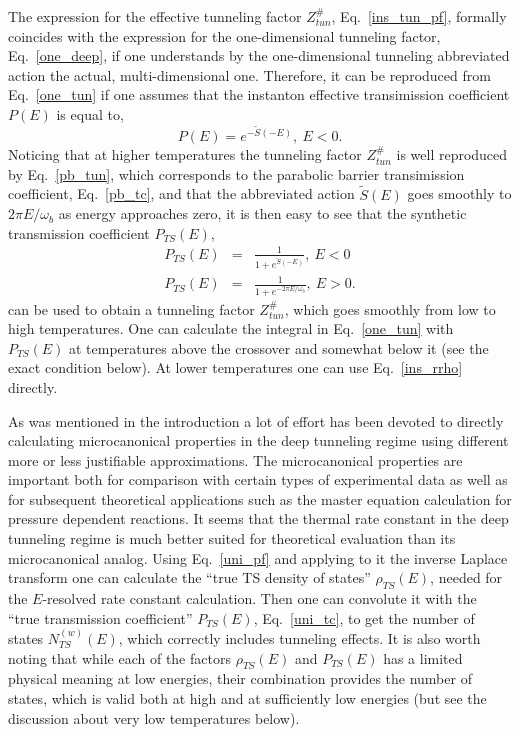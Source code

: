 \documentclass[journal=jpcafh,manuscript=article]{achemso}
\begin{document}
The expression for the effective tunneling factor $Z^\#_{tun}$,
Eq.~\ref{ins_tun_pf}, formally coincides with the expression for the
one-dimensional tunneling factor, Eq.~\ref{one_deep}, if one
understands by the one-dimensional tunneling abbreviated action the
actual, multi-dimensional one. Therefore, it can be reproduced from
Eq.~\ref{one_tun} if one assumes that the instanton effective
transimission coefficient $P(E)$ is equal to,
\begin{equation}
  \label{ins_tc}
  P(E)=e^{-\tilde{S}(-E)},\ E<0.
\end{equation}
Noticing that at higher temperatures the tunneling factor $Z^\#_{tun}$
is well reproduced by Eq.~\ref{pb_tun}, which corresponds to the
parabolic barrier transimission coefficient, Eq.~\ref{pb_tc}, and that
the abbreviated action $\tilde{S}(E)$ goes smoothly to
$2\pi E/\omega_b$ as energy approaches zero, it is then easy to see
that the synthetic transmission coefficient
$P_{TS}(E)$,
\begin{eqnarray}
  \label{uni_tc}
  P_{TS}(E) &=& \frac{1}{1 + e^{\tilde{S}(-E)}},\ E<0
  \\
  \nonumber
  P_{TS}(E) &=& \frac{1}{1 + e^{-2\pi E/\omega_b}},\ E>0.
\end{eqnarray}
can be used to obtain a tunneling factor $Z^\#_{tun}$, which goes
smoothly from low to high
temperatures. \cite{affleck81,richardson16a,kemble35} One can
calculate the integral in Eq.~\ref{one_tun} with $P_{TS}(E)$ at
temperatures above the crossover and somewhat below it (see the exact
condition below). At lower temperatures one can use Eq.~\ref{ins_rrho}
directly.

As was mentioned in the introduction a lot of effort has been devoted
to directly calculating microcanonical properties in the deep
tunneling regime using different more or less justifiable
approximations. The microcanonical properties are important both for
comparison with certain types of experimental data as well as for
subsequent theoretical applications such as the master equation
calculation for pressure dependent reactions.  It seems that the
thermal rate constant in the deep tunneling regime is much better
suited for theoretical evaluation than its microcanonical
analog. Using Eq.~\ref{uni_pf} and applying to it the inverse Laplace
transform\cite{fang21} one can calculate the ``true TS density of
states'' $\rho_{TS}(E)$, needed for the $E$-resolved rate constant
calculation. Then one can convolute it with the ``true transmission
coefficient'' $P_{TS}(E)$, Eq.~\ref{uni_tc}, to get the number of
states $N_{TS}^{(w)}(E)$, which correctly includes tunneling effects.
It is also worth noting that while each of the factors $\rho_{TS}(E)$
and $P_{TS}(E)$ has a limited physical meaning at low energies, their
combination provides the number of states, which is valid both at high
and at sufficiently low energies (but see the discussion about very
low temperatures below).
\end{document}

